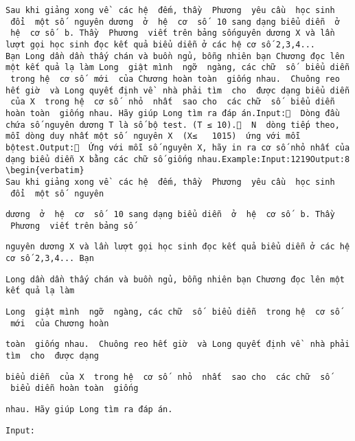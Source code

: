
\begin{verbatim}
Sau khi giảng xong về  các hệ  đếm, thầy  Phương  yêu cầu  học sinh  đổi  một số  nguyên dương  ở  hệ  cơ  số  10 sang dạng biểu diễn  ở  hệ  cơ số  b. Thầy  Phương  viết trên bảng sốnguyên dương X và lần lượt gọi học sinh đọc kết quả biểu diễn ở các hệ cơ số 2,3,4... Bạn Long dần dần thấy chán và buồn ngủ, bỗng nhiên bạn Chương đọc lên một kết quả lạ làm Long  giật mình  ngỡ  ngàng, các chữ  số  biểu diễn  trong hệ  cơ số  mới  của Chương hoàn toàn  giống nhau.  Chuông reo hết giờ  và Long quyết định về  nhà phải tìm  cho  được dạng biểu diễn  của X  trong hệ  cơ số  nhỏ  nhất  sao cho  các chữ  số  biểu diễn hoàn toàn  giống nhau. Hãy giúp Long tìm ra đáp án.Input:  Dòng đầu chứa số nguyên dương T là số bộ test. (T ≤ 10).  N  dòng tiếp theo, mỗi dòng duy nhất một số  nguyên X  (X≤   1015)  ứng với mỗi bộtest.Output:  Ứng với mỗi số nguyên X, hãy in ra cơ số nhỏ nhất của dạng biểu diễn X bằng các chữ số giống nhau.Example:Input:1219Output:8
\begin{verbatim}
Sau khi giảng xong về  các hệ  đếm, thầy  Phương  yêu cầu  học sinh  đổi  một số  nguyên \end{verbatim}
\begin{verbatim}
dương  ở  hệ  cơ  số  10 sang dạng biểu diễn  ở  hệ  cơ số  b. Thầy  Phương  viết trên bảng số\end{verbatim}
\begin{verbatim}
nguyên dương X và lần lượt gọi học sinh đọc kết quả biểu diễn ở các hệ cơ số 2,3,4... Bạn \end{verbatim}
\begin{verbatim}
Long dần dần thấy chán và buồn ngủ, bỗng nhiên bạn Chương đọc lên một kết quả lạ làm \end{verbatim}
\begin{verbatim}
Long  giật mình  ngỡ  ngàng, các chữ  số  biểu diễn  trong hệ  cơ số  mới  của Chương hoàn \end{verbatim}
\begin{verbatim}
toàn  giống nhau.  Chuông reo hết giờ  và Long quyết định về  nhà phải tìm  cho  được dạng \end{verbatim}
\begin{verbatim}
biểu diễn  của X  trong hệ  cơ số  nhỏ  nhất  sao cho  các chữ  số  biểu diễn hoàn toàn  giống \end{verbatim}
\begin{verbatim}
nhau. Hãy giúp Long tìm ra đáp án.\end{verbatim}
\begin{verbatim}
Input:\end{verbatim}

